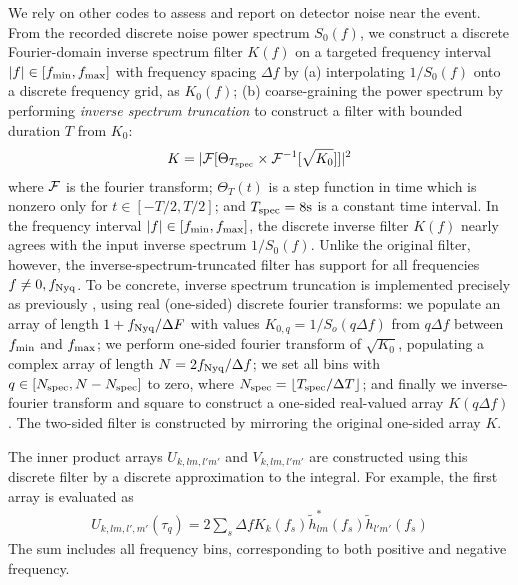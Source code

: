 \documentclass[twocolumn,prd,nofootinbib]{revtex4}
\DeclarePairedDelimiter\floor{\lfloor}{\rfloor}
\newcommand\unit[1]{{\rm #1}}
\begin{document}
We rely on other codes to assess and report on detector noise near the event.   From the recorded discrete noise power
spectrum $S_0(f)$, we construct a discrete Fourier-domain inverse spectrum filter $K(f)$ on a targeted frequency interval $|f|
\in [f_{\rm min}, f_{\rm max}]$ with frequency spacing $\Delta f$ by 
(a) interpolating $1/S_0(f)$ onto a discrete frequency grid, as $K_0(f)$; 
(b) coarse-graining the power spectrum by performing \emph{inverse spectrum truncation} \cite{2012PhRvD..85l2006A} to construct a filter with bounded duration $T$ from $K_0$:
\begin{eqnarray}
 K =  |{\cal F} [\Theta_{T_{\rm spec}} \times {\cal F}^{-1}[ \sqrt{K_0} ]]|^2
\end{eqnarray}
where ${\cal F}$ is the fourier transform; $\Theta_T(t)$ is a step function in time which is nonzero only for $t\in[-T/2,T/2]$; and $T_{\rm spec}=8\unit{s}$ is a
constant time interval. 
%
In the frequency interval $|f|\in[f_{\rm min},f_{\rm max}]$, the discrete inverse filter $K(f)$ nearly agrees with the
input inverse spectrum $1/S_0(f)$.  Unlike the original filter, however, the inverse-spectrum-truncated filter has
support for all frequencies $f\ne 0,f_{\rm Nyq}$.     
%
To be concrete, inverse spectrum truncation is implemented precisely as previously  \cite{2012PhRvD..85l2006A}, using
real (one-sided) discrete fourier transforms: 
%
we populate an array of length $1+f_{\rm Nyq}/\Delta F$ with values $K_{0,q} =1/S_o(q \Delta f)$ from $q\Delta f$ between $f_{\rm min}$ and $f_{\rm max}$; 
we perform one-sided fourier transform of $\sqrt{K_{0}}$, populating a complex array of length $N=2 f_{\rm Nyq}/\Delta f$; 
we set all bins with $q\in [N_{\rm spec}, N-N_{\rm spec}]$ to zero, where $N_{\rm spec} = \floor*{T_{\rm spec}/\Delta
  T}$; 
and  finally we inverse-fourier transform and square to construct a one-sided real-valued array $K(q\Delta f)$.  
%
The two-sided filter is constructed by mirroring the original one-sided array $K$.  

The inner product arrays $U_{k,lm,l'm'}$ and $V_{k,lm,l'm'}$ are constructed using this discrete filter by a discrete
approximation to the integral.  For example, the first array is evaluated as
\begin{eqnarray}
U_{k,lm,l',m'}(\tau_q) = 2 \sum_s \Delta f  K_k(f_s) \tilde{h}_{lm}^*(f_s) \tilde{h}_{l'm'}(f_s)
\end{eqnarray}
The sum includes all frequency bins, corresponding to both positive and negative frequency.  %
\end{document}
